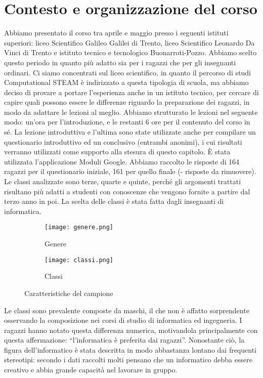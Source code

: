 \section{Contesto e organizzazione del corso}
Abbiamo presentato il corso tra aprile e maggio presso i seguenti istituti superiori: liceo Scientifico Galileo Galilei di Trento, liceo Scientifico Leonardo Da Vinci di Trento e istituto tecnico e tecnologico Buonarroti-Pozzo. Abbiamo scelto questo periodo in quanto più adatto sia per i ragazzi che per gli insegnanti ordinari. Ci siamo concentrati sul liceo scientifico, in quanto il percorso di studi Computational STEAM è indirizzato a questa tipologia di scuola, ma abbiamo deciso di provare a portare l’esperienza anche in un istituto tecnico, per cercare di capire quali possono essere le differenze riguardo la preparazione dei ragazzi, in modo da adattare le lezioni al meglio. Abbiamo strutturato le lezioni nel seguente modo: un’ora per l’introduzione, e le restanti 6 ore per il contenuto del corso in sé. La lezione introduttiva e l’ultima sono state utilizzate anche per compilare un questionario introduttivo ed un conclusivo (entrambi anonimi), i cui risultati verranno utilizzati come supporto alla stesura di questo capitolo. È stata utilizzata l’applicazione Moduli Google. Abbiamo raccolto le risposte di 164 ragazzi per il questionario iniziale, 161 per quello finale (- risposte da rimuovere).
Le classi analizzate sono terze, quarte e quinte, perché gli argomenti trattati risultano più adatti a studenti con conoscenze che vengono fornite a partire dal terzo anno in poi. La scelta delle classi è stata fatta dagli insegnanti di informatica. 
\begin{figure}[!h]
    \begin{subfigure}{.4\textwidth}
        \centering
        \texttt{[image: genere.png]}
        \caption{Genere}
        \label{fig:genere}
    \end{subfigure}\hfill
    \begin{subfigure}{.4\textwidth}
        \centering
        \texttt{[image: classi.png]}
        \caption{Classi}
        \label{fig:classi}
    \end{subfigure}
    \caption{Caratteristiche del campione} 
\end{figure}
Le classi sono prevalente composte da maschi, il che non è affatto sorprendente osservando la composizione nei corsi di studio di informatica ed ingegneria. I ragazzi hanno notato questa differenza numerica, motivandola principalmente con questa affermazione: “l'informatica è preferita dai ragazzi”. Nonostante ciò, la figura dell’informatico è stata descritta in modo abbastanza lontano dai frequenti stereotipi: secondo i dati raccolti molti pensano che un informatico debba essere creativo e abbia grande capacità nel lavorare in gruppo. 

